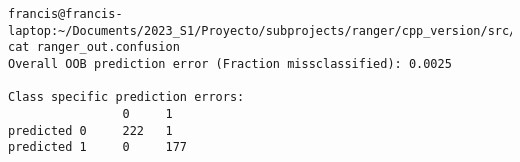 \documentclass[12pt,oneside]{book}
\begin{document}
  \begin{lstlisting}
francis@francis-laptop:~/Documents/2023_S1/Proyecto/subprojects/ranger/cpp_version/src/build$ cat ranger_out.confusion 
Overall OOB prediction error (Fraction missclassified): 0.0025

Class specific prediction errors:
                0     1
predicted 0     222   1     
predicted 1     0     177 
  \end{lstlisting}

  \printbibliography[title={Bibliografía},heading=bibintoc]
\end{document}
